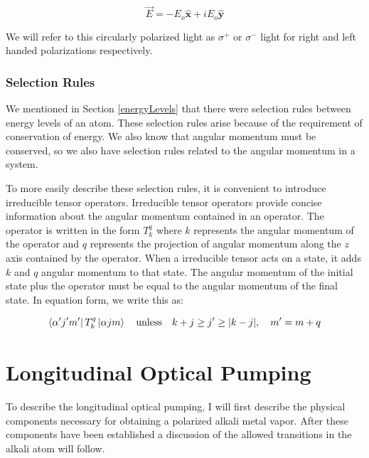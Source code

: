 \documentclass[12pt]{article}
\newcommand{\xhat}{\hat{\textbf{x}}}
\newcommand{\yhat}{\hat{\textbf{y}}}
\begin{document}
		\begin{equation}
			\vec{E}=-E_o \xhat  +iE_o \yhat 
		\end{equation}

		We will refer to this circularly polarized light as 
		$\sigma^{+}$ or $\sigma^{-}$ light for right and 
		left handed polarizations respectively.
		
		\subsubsection{Selection Rules}\label{selectionRules}
		We mentioned in Section \ref{energyLevels} that there
		were selection rules between energy levels of an atom.
		These selection rules arise because of the requirement
		of conservation of energy. We also know that angular 
		momentum must be conserved, so we also have selection
		rules related to the angular momentum in a system. 

		To more easily describe these selection rules, it is
		convenient to introduce irreducible tensor operators. 
		Irreducible tensor operators provide concise information
		about the angular momentum contained in an operator.
		The operator is written in the form $T^{q}_{k}$ where
		$k$ represents the angular momentum of the operator
		and $q$ represents the projection of angular momentum
		along the $z$ axis contained by the operator. When a
		irreducible tensor acts on a state, it adds $k$ and 
		$q$ angular momentum to that state. The angular momentum
		of the initial state plus the operator must be
		equal to the angular momentum of the final state. In
		equation form, we write this as: 

		\begin{equation}
			\bra{\alpha'j'm'}T^{q}_{k}\ket{\alpha jm}\quad \textrm{unless} \quad k+j\geq j' 
			\geq \vert k-j \vert,\quad m'=m+q
		\end{equation}



\section{Longitudinal Optical Pumping}
To describe the longitudinal optical pumping, I will
first describe the physical components necessary for
obtaining a polarized alkali metal vapor. After these 
components have been established a discussion of the 
allowed transitions in the alkali atom will follow. 
\end{document}
